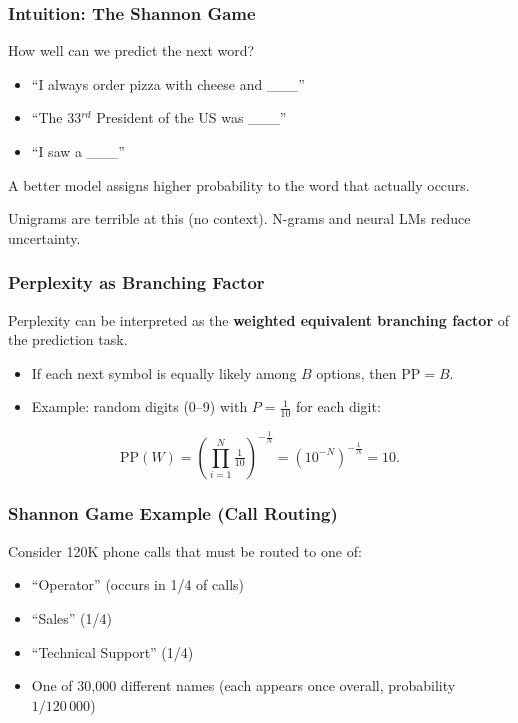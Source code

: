 \documentclass[11pt,a4paper]{article}
\theoremstyle{definition}
\theoremstyle{plain}
\theoremstyle{remark}
\begin{document}
\subsubsection{Intuition: The Shannon Game}

\begin{tcolorbox}[colback=blue!5!white,colframe=blue!75!black,title=\textbf{Predict the next word}]
How well can we predict the next word?
\begin{itemize}
    \item ``I always order pizza with cheese and \_\_\_''
    \item ``The 33$^{rd}$ President of the US was \_\_\_''
    \item ``I saw a \_\_\_''
\end{itemize}
A better model assigns higher probability to the word that actually occurs.
\end{tcolorbox}

Unigrams are terrible at this (no context). N-grams and neural LMs reduce uncertainty.

\subsubsection{Perplexity as Branching Factor}

Perplexity can be interpreted as the \textbf{weighted equivalent branching factor} of the prediction task.

\begin{itemize}
    \item If each next symbol is equally likely among $B$ options, then $\text{PP} = B$.
    \item Example: random digits (0--9) with $P=\tfrac{1}{10}$ for each digit:
\end{itemize}

\[
\text{PP}(W) = \left(\prod_{i=1}^{N} \tfrac{1}{10}\right)^{-\tfrac{1}{N}} = \left(10^{-N}\right)^{-\tfrac{1}{N}} = 10.
\]

\subsubsection{Shannon Game Example (Call Routing)}

Consider 120K phone calls that must be routed to one of:
\begin{itemize}
    \item ``Operator'' (occurs in 1/4 of calls)
    \item ``Sales'' (1/4)
    \item ``Technical Support'' (1/4)
    \item One of 30,000 different names (each appears once overall, probability $1/120\,000$)
\end{itemize}
\end{document}
